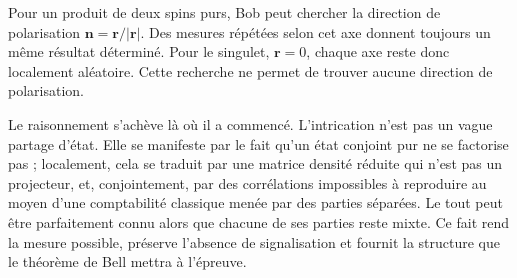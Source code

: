 Pour un produit de deux spins purs, Bob peut chercher la direction de polarisation \(\mathbf n=\mathbf r/|\mathbf r|\). Des mesures répétées selon cet axe donnent toujours un même résultat déterminé. Pour le singulet, \(\mathbf r=0\), chaque axe reste donc localement aléatoire. Cette recherche ne permet de trouver aucune direction de polarisation.

\begin{classroomqa}
\end{classroomqa}

\begin{classroomqa}
\end{classroomqa}

Le raisonnement s'achève là où il a commencé. L'intrication n'est pas un vague partage d'état. Elle se manifeste par le fait qu'un état conjoint pur ne se factorise pas ; localement, cela se traduit par une matrice densité réduite qui n'est pas un projecteur, et, conjointement, par des corrélations impossibles à reproduire au moyen d'une comptabilité classique menée par des parties séparées. Le tout peut être parfaitement connu alors que chacune de ses parties reste mixte. Ce fait rend la mesure possible, préserve l'absence de signalisation et fournit la structure que le théorème de Bell mettra à l'épreuve.
